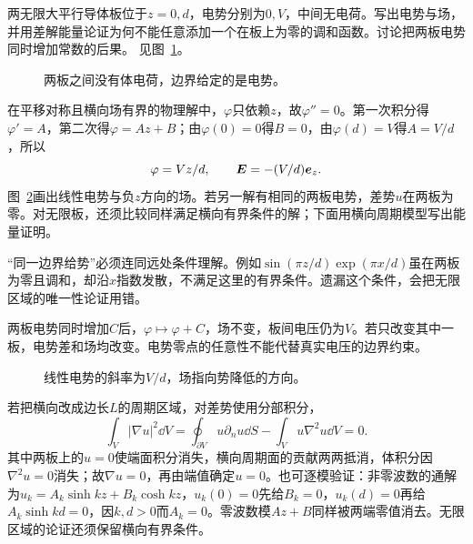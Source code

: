 \begin{example}[两块导体间的唯一电势]\label{ex:es2-e1}
两无限大平行导体板位于$z=0,d$，电势分别为$0,V$，中间无电荷。写出电势与场，并用差解能量论证为何不能任意添加一个在板上为零的调和函数。讨论把两板电势同时增加常数的后果。 见图~\ref{fig:es2-e1-q}。
\end{example}

\begin{figure}[H]\centering
{}
\caption{两板之间没有体电荷，边界给定的是电势。}\label{fig:es2-e1-q}
\end{figure}
\begin{solution}
在平移对称且横向场有界的物理解中，$\varphi$只依赖$z$，故$\varphi''=0$。第一次积分得$\varphi'=A$，第二次得$\varphi=Az+B$；由$\varphi(0)=0$得$B=0$，由$\varphi(d)=V$得$A=V/d$，所以
\[\varphi=Vz/d,\qquad \bm{E}=-(V/d)\bm{e}_z.\]
图~\ref{fig:es2-e1-s}画出线性电势与负$z$方向的场。若另一解有相同的两板电势，差势$u$在两板为零。对无限板，还须比较同样满足横向有界条件的解；下面用横向周期模型写出能量证明。

“同一边界给势”必须连同远处条件理解。例如$\sin(\pi z/d)\exp(\pi x/d)$虽在两板为零且调和，却沿$x$指数发散，不满足这里的有界条件。遗漏这个条件，会把无限区域的唯一性论证用错。

两板电势同时增加$C$后，$\varphi\mapsto\varphi+C$，场不变，板间电压仍为$V$。若只改变其中一板，电势差和场均改变。电势零点的任意性不能代替真实电压的边界约束。
\begin{figure}[H]\centering
{}
\caption{线性电势的斜率为$V/d$，场指向势降低的方向。}\label{fig:es2-e1-s}
\end{figure}


若把横向改成边长$L$的周期区域，对差势使用分部积分，
\[\int_V|\nabla u|^2\dd V=\oint_{\partial V}u\partial_nu\dd S-\int_Vu\nabla^2u\dd V=0.\]
其中两板上的$u=0$使端面积分消失，横向周期面的贡献两两抵消，体积分因$\nabla^2u=0$消失；故$\nabla u=0$，再由端值确定$u=0$。也可逐模验证：非零波数的通解为$u_k=A_k\sinh kz+B_k\cosh kz$，$u_k(0)=0$先给$B_k=0$，$u_k(d)=0$再给$A_k\sinh kd=0$，因$k,d>0$而$A_k=0$。零波数模$Az+B$同样被两端零值消去。无限区域的论证还须保留横向有界条件。
\end{solution}

